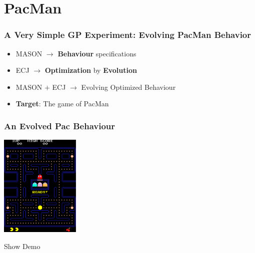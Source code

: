\documentclass{beamer}
\begin{document}
\section{PacMan}	%
\begin{frame}
	\frametitle{A Very Simple GP Experiment: Evolving PacMan Behavior}
	\begin{block}{}
		\begin{itemize}
			\setlength{\itemsep}{0.75cm}
			\item MASON $\rightarrow$ \textbf{Behaviour} specifications
			\item ECJ $\rightarrow$ \textbf{Optimization} by \textbf{Evolution}
			\item MASON $+$ ECJ $\rightarrow$ Evolving Optimized Behaviour
			\item \textbf{Target}: The game of PacMan 
		\end{itemize}
	\end{block}
\end{frame}
\begin{frame}
	\frametitle{An Evolved Pac Behaviour}
	\begin{block}{}
		\centering
		\includegraphics[width=1.5in,keepaspectratio]{pac-man.pdf}
	\end{block}
	\vspace{-25pt}
	\begin{block}{}
		\Huge{\centerline{Show Demo}}
	\end{block}
\end{frame}
\end{document}
